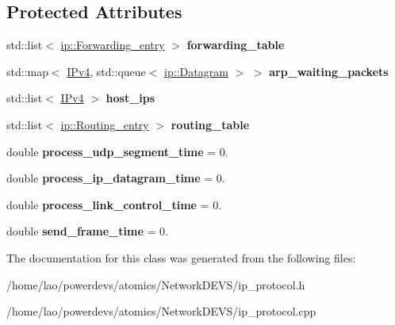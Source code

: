 \subsection*{Protected Attributes}
\begin{DoxyCompactItemize}
\item 
std\+::list$<$ \hyperlink{structip_1_1Forwarding__entry}{ip\+::\+Forwarding\+\_\+entry} $>$ {\bfseries forwarding\+\_\+table}\hypertarget{classip__protocol_aaeb5d99cd92641500f0013e3822d56a1}{}\label{classip__protocol_aaeb5d99cd92641500f0013e3822d56a1}

\item 
std\+::map$<$ \hyperlink{structIPv4}{I\+Pv4}, std\+::queue$<$ \hyperlink{structip_1_1Datagram}{ip\+::\+Datagram} $>$ $>$ {\bfseries arp\+\_\+waiting\+\_\+packets}\hypertarget{classip__protocol_a284258e9e9050ae7e51b3864f5a953ce}{}\label{classip__protocol_a284258e9e9050ae7e51b3864f5a953ce}

\item 
std\+::list$<$ \hyperlink{structIPv4}{I\+Pv4} $>$ {\bfseries host\+\_\+ips}\hypertarget{classip__protocol_aa7d9cb9aba71a12d55cbb48ebb8023bf}{}\label{classip__protocol_aa7d9cb9aba71a12d55cbb48ebb8023bf}

\item 
std\+::list$<$ \hyperlink{structip_1_1Routing__entry}{ip\+::\+Routing\+\_\+entry} $>$ {\bfseries routing\+\_\+table}\hypertarget{classip__protocol_a10115583b02359dd2a5670d1ad15f491}{}\label{classip__protocol_a10115583b02359dd2a5670d1ad15f491}

\item 
double {\bfseries process\+\_\+udp\+\_\+segment\+\_\+time} = 0.\hypertarget{classip__protocol_a70dbab92c8f81ef06fd54f3e8d7bd948}{}\label{classip__protocol_a70dbab92c8f81ef06fd54f3e8d7bd948}

\item 
double {\bfseries process\+\_\+ip\+\_\+datagram\+\_\+time} = 0.\hypertarget{classip__protocol_a5a4799b4959601058134ada5e68535d9}{}\label{classip__protocol_a5a4799b4959601058134ada5e68535d9}

\item 
double {\bfseries process\+\_\+link\+\_\+control\+\_\+time} = 0.\hypertarget{classip__protocol_a5d8f0b585621473601c220ad283a825f}{}\label{classip__protocol_a5d8f0b585621473601c220ad283a825f}

\item 
double {\bfseries send\+\_\+frame\+\_\+time} = 0.\hypertarget{classip__protocol_a228a55f7b2c25fa8e3900893ccc87e41}{}\label{classip__protocol_a228a55f7b2c25fa8e3900893ccc87e41}

\end{DoxyCompactItemize}


The documentation for this class was generated from the following files\+:\begin{DoxyCompactItemize}
\item 
/home/lao/powerdevs/atomics/\+Network\+D\+E\+V\+S/ip\+\_\+protocol.\+h\item 
/home/lao/powerdevs/atomics/\+Network\+D\+E\+V\+S/ip\+\_\+protocol.\+cpp\end{DoxyCompactItemize}
